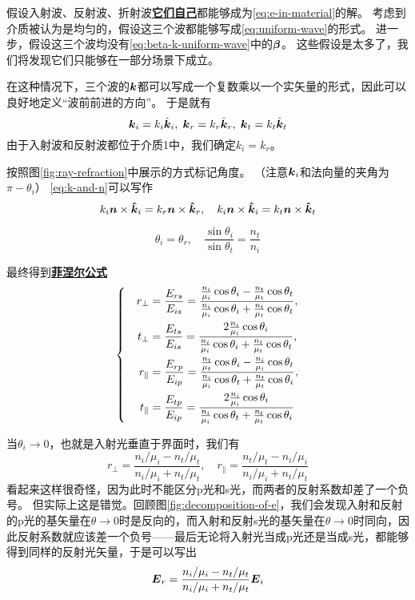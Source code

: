 \documentclass[UTF8, a4paper]{ctexart}
\newcommand*{\concept}[1]{\underline{\textbf{#1}}}
\newenvironment{bigcase}{\left\{\quad\begin{aligned}}{\end{aligned}\right.}
\begin{document}
假设入射波、反射波、折射波\concept{它们自己}都能够成为\eqref{eq:e-in-material}的解。
考虑到介质被认为是均匀的，假设这三个波都能够写成\eqref{eq:uniform-wave}的形式。
进一步，假设这三个波均没有\eqref{eq:beta-k-uniform-wave}中的$\vb*{\beta}$。
这些假设是太多了，我们将发现它们只能够在一部分场景下成立。

在这种情况下，三个波的$\vb*{k}$都可以写成一个复数乘以一个实矢量的形式，因此可以良好地定义“波前前进的方向”。
于是就有
\[
    \vb*{k}_i = k_i \hat{\vb*{k}}_i, \; \vb*{k}_r = k_r \hat{\vb*{k}}_r, \; \vb*{k}_t = k_t \hat{\vb*{k}}_t
\]
由于入射波和反射波都位于介质1中，我们确定$k_i=k_r$。

按照图\ref{fig:ray-refraction}中展示的方式标记角度。
（注意$\vb*{k}_i$和法向量的夹角为$\pi-\theta_i$）
\eqref{eq:k-and-n}可以写作
\[
    k_i \vb*{n} \times \vu*{k}_i = k_r \vb*{n} \times \vu*{k}_r, \quad k_i \vb*{n} \times \vu*{k}_i = k_t \vb*{n} \times \vu*{k}_t
\]

\begin{equation}
    \theta_i = \theta_r, \quad \frac{\sin \theta_i}{\sin \theta_t} = \frac{n_t}{n_i}
    \label{eq:snell}
\end{equation}

最终得到\concept{菲涅尔公式}
\begin{equation}
    \begin{bigcase}
        r_\bot &= \frac{E_{rs}}{E_{is}} = 
        \frac{\frac{n_i}{\mu_i} \cos \theta_i - \frac{n_t}{\mu_t} \cos \theta_t}{\frac{n_i}{\mu_i} \cos \theta_i + \frac{n_t}{\mu_t} \cos \theta_t}, \\
        t_\bot &= \frac{E_{ts}}{E_{is}} = 
        \frac{2 \frac{n_i}{\mu_i} \cos \theta_i}{\frac{n_i}{\mu_i} \cos \theta_i + \frac{n_t}{\mu_t} \cos \theta_t}, \\
        r_\parallel &= \frac{E_{rp}}{E_{ip}} = 
        \frac{\frac{n_t}{\mu_t} \cos \theta_i - \frac{n_i}{\mu_i} \cos \theta_t}{\frac{n_i}{\mu_i} \cos \theta_t + \frac{n_t}{\mu_t} \cos \theta_i}, \\
        t_\parallel &= \frac{E_{tp}}{E_{ip}} =
        \frac{2 \frac{n_i}{\mu_i} \cos \theta_i}{\frac{n_i}{\mu_i} \cos \theta_t + \frac{n_t}{\mu_t} \cos \theta_i}
    \end{bigcase}
    \label{eq:fresnel-formulas}
\end{equation}

当$\theta_i \to 0$，也就是入射光垂直于界面时，我们有
\begin{equation}
    r_\bot = \frac{n_i / \mu_i - n_t / \mu_t}{n_i / \mu_i + n_t / \mu_t}, \quad 
    r_\parallel = \frac{n_t / \mu_t - n_i / \mu_i}{n_i / \mu_i + n_t / \mu_t}
\end{equation}
看起来这样很奇怪，因为此时不能区分p光和s光，而两者的反射系数却差了一个负号。
但实际上这是错觉。回顾图\ref{fig:decomposition-of-e}，我们会发现入射和反射的p光的基矢量在$\theta \to 0$时是反向的，而入射和反射s光的基矢量在$\theta \to 0$时同向，因此反射系数就应该差一个负号——最后无论将入射光当成p光还是当成s光，都能够得到同样的反射光矢量，于是可以写出
\begin{equation}
    \vb*{E}_r = \frac{n_i / \mu_i - n_t / \mu_t}{n_i / \mu_i + n_t / \mu_t} \vb*{E}_i
\end{equation}
\end{document}
